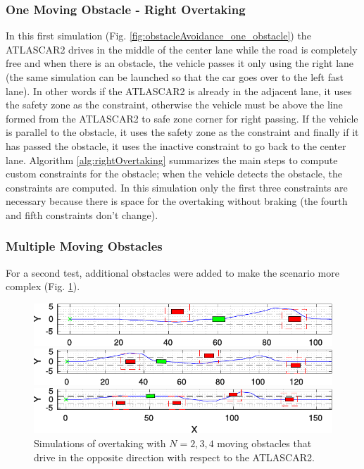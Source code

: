 \documentclass[conference,11pt]{IEEEtran}
\begin{document}
\subsubsection{One Moving Obstacle - Right Overtaking}
In this first simulation
(Fig. \ref{fig:obstacleAvoidance_one_obstacle}) the ATLASCAR2 drives in the middle of the center lane while the road is completely free and when there is an obstacle, the vehicle passes it only using the right lane (the same simulation can be launched so that the car goes over to the left fast lane). In other words if the ATLASCAR2 is already in the adjacent lane, it uses the safety zone as the constraint, otherwise the vehicle must be above the line formed from the ATLASCAR2 to safe zone corner for right passing. If the vehicle is parallel to the obstacle, it  uses the safety zone as the constraint and finally if it has passed the obstacle, it uses the inactive constraint to go back to the center lane.
Algorithm \ref{alg:rightOvertaking} summarizes the main steps to compute custom constraints for the obstacle; when the vehicle detects the obstacle, the constraints are computed. In this simulation only the first three constraints are necessary because there is space for the overtaking without braking (the fourth and fifth constraints don't change).  
%
\subsubsection{Multiple Moving Obstacles}
For a second test, additional obstacles were added to make the scenario more complex (Fig. \ref{fig:obstacleAvoidance_random}).
\begin{figure}[!h]
	\centering
	\begin{minipage}[t]{\columnwidth}
	\includegraphics[width=1\columnwidth]{./figure/random_N_obstacles/overtaking_random_2.pdf}
	\end{minipage}
	\begin{minipage}[t]{\columnwidth}
	\includegraphics[width=1\columnwidth]{./figure/random_N_obstacles/overtaking_random.pdf}
	\end{minipage}
	\begin{minipage}[t]{\columnwidth}
	\includegraphics[width=1\columnwidth]{./figure/random_N_obstacles/overtaking_random_1.pdf}
	\end{minipage}
	\caption{Simulations of overtaking with $N = 2,3,4$ moving obstacles that drive in the opposite direction with respect to the ATLASCAR2.}
	\label{fig:obstacleAvoidance_random}
\end{figure}
\end{document}
